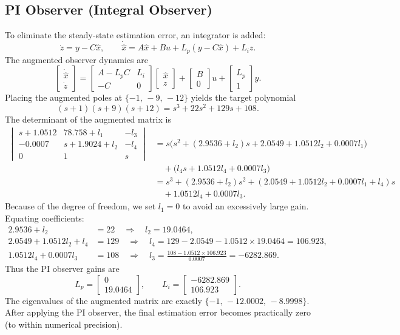 \documentclass[12pt,a4paper]{article}
\begin{document}
\subsection{PI Observer (Integral Observer)}
To eliminate the steady‑state estimation error, an integrator is added:
\[
\dot{z} = y - C\hat{x},\qquad
\dot{\hat{x}} = A\hat{x} + B u + L_p(y - C\hat{x}) + L_i z.
\]
The augmented observer dynamics are
\[
\begin{bmatrix}
\dot{\hat{x}} \\ \dot{z}
\end{bmatrix}
=
\begin{bmatrix}
A - L_p C & L_i \\ -C & 0
\end{bmatrix}
\begin{bmatrix} \hat{x} \\ z \end{bmatrix}
+
\begin{bmatrix} B \\ 0 \end{bmatrix} u
+
\begin{bmatrix} L_p \\ 1 \end{bmatrix} y.
\]
Placing the augmented poles at $\{-1,\,-9,\,-12\}$ yields the target polynomial
\[
(s+1)(s+9)(s+12) = s^3 + 22s^2 + 129s + 108.
\]
The determinant of the augmented matrix is
\begin{align*}
\begin{vmatrix}
s+1.0512 & 78.758+l_1 & -l_3 \\
-0.0007 & s+1.9024+l_2 & -l_4 \\
0 & 1 & s
\end{vmatrix}
&= s\bigl(s^2 + (2.9536+l_2)s + 2.0549 + 1.0512l_2 + 0.0007l_1\bigr) \\
&\quad + \bigl(l_4 s + 1.0512l_4 + 0.0007l_3\bigr) \\
&= s^3 + (2.9536+l_2)s^2 + (2.0549 + 1.0512l_2 + 0.0007l_1 + l_4)s \\
&\quad + 1.0512l_4 + 0.0007l_3.
\end{align*}
Because of the degree of freedom, we set $l_1=0$ to avoid an excessively large gain. Equating coefficients:
\begin{align*}
2.9536 + l_2 &= 22 \quad\Rightarrow\quad l_2 = 19.0464,\\
2.0549 + 1.0512l_2 + l_4 &= 129 \quad\Rightarrow\quad l_4 = 129 - 2.0549 - 1.0512\times19.0464 = 106.923,\\
1.0512l_4 + 0.0007l_3 &= 108 \quad\Rightarrow\quad l_3 = \frac{108 - 1.0512\times106.923}{0.0007} = -6282.869.
\end{align*}
Thus the PI observer gains are
\[
L_p = \begin{bmatrix} 0 \\ 19.0464 \end{bmatrix},\qquad
L_i = \begin{bmatrix} -6282.869 \\ 106.923 \end{bmatrix}.
\]
The eigenvalues of the augmented matrix are exactly $\{-1,\,-12.0002,\,-8.9998\}$. After applying the PI observer, the final estimation error becomes practically zero (to within numerical precision).
\end{document}
